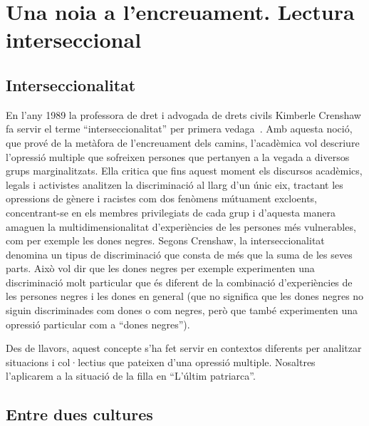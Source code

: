 \section{Una noia a l'encreuament. Lectura interseccional}

\subsection{Interseccionalitat}

En l'any 1989 la professora de dret i advogada de drets civils Kimberle Crenshaw fa servir el terme ``interseccionalitat'' per primera vedaga~\autocite{Crenshaw1989}.
Amb aquesta noció, que prové de la metàfora de l'encreuament dels camins, l'acadèmica vol descriure l'opressió multiple que sofreixen persones que pertanyen a la vegada a diversos grups marginalitzats.
Ella critica que fins aquest moment els discursos acadèmics, legals i activistes analitzen la discriminació al llarg d'un únic eix,
tractant les opressions de gènere i racistes com dos fenòmens mútuament excloents,
concentrant-se en els membres privilegiats de cada grup i d'aquesta manera amaguen la multidimensionalitat d'experiències de les persones més vulnerables, com per exemple les dones negres.
Segons Crenshaw, la interseccionalitat denomina un tipus de discriminació que consta de més que la suma de les seves parts.
Això vol dir que les dones negres per exemple experimenten una discriminació molt particular que és diferent de la combinació d'experiències de les persones negres i les dones en general (que no significa que les dones negres no siguin discriminades com dones o com negres, però que també experimenten una opressió particular com a ``dones negres'').

Des de llavors, aquest concepte s'ha fet servir en contextos diferents per analitzar situacions i col·lectius que pateixen d'una opressió multiple.
Nosaltres l'aplicarem a la situació de la filla en ``L'últim patriarca''.

\begin{comment}
* Identitaetssuche (vgl. versuchen den eigenen Platz zu finden; die Freund*innen angucken; in die Religion; )
\end{comment}

\subsection{Entre dues cultures}

